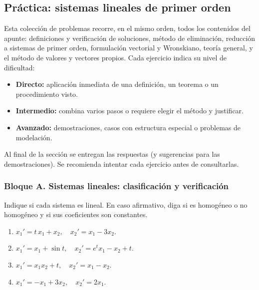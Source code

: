 \providecommand{\est}[1]{\textcolor{bbeamber}{\ifcase#1\or\ding{72}\or\ding{72}\ding{72}\or\ding{72}\ding{72}\ding{72}\fi}}

\newpage
\subsection{Práctica: sistemas lineales de primer orden}

Esta colección de problemas recorre, en el mismo orden, todos los contenidos del apunte: definiciones y verificación de soluciones, método de eliminación, reducción a sistemas de primer orden, formulación vectorial y Wronskiano, teoría general, y el método de valores y vectores propios. Cada ejercicio indica su nivel de dificultad:

\begin{itemize}
    \item[] \est{1} \textbf{Directo:} aplicación inmediata de una definición, un teorema o un procedimiento visto.
    \item[] \est{2} \textbf{Intermedio:} combina varios pasos o requiere elegir el método y justificar.
    \item[] \est{3} \textbf{Avanzado:} demostraciones, casos con estructura especial o problemas de modelación.
\end{itemize}

Al final de la sección se entregan las respuestas (y sugerencias para las demostraciones). Se recomienda intentar cada ejercicio antes de consultarlas.

\subsubsection*{Bloque A. Sistemas lineales: clasificación y verificación}

\begin{exercise}[\est{1}]\label{ex:A1}
Indique si cada sistema es lineal. En caso afirmativo, diga si es homogéneo o no homogéneo y si sus coeficientes son constantes.
\begin{enumerate}[a]
    \item $x_1' = t\,x_1 + x_2, \quad x_2' = x_1 - 3x_2.$
    \item $x_1' = x_1 + \sin t, \quad x_2' = e^t x_1 - x_2 + t.$
    \item $x_1' = x_1x_2 + t, \quad x_2' = x_1 - x_2.$
    \item $x_1' = -x_1 + 3x_2, \quad x_2' = 2x_1.$
\end{enumerate}
\end{exercise}


